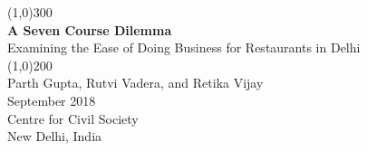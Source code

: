 \documentclass[a4paper, 12pt]{article}
\begin{document}
                    
                    
                    \begin{titlepage}
                    \begin{center}
                    	
			\line(1,0){300}\\
                    	[0.25in]
                    	\huge{\bfseries \textcolor{CCSbrown} {A Seven Course Dilemma}} \\
    			[0.5cm]
    			\large  {Examining the Ease of Doing Business for Restaurants in Delhi} \\%
    	
                    	\line(1,0){200}\\
                    	[1in]
                    	\Large {Parth Gupta, Rutvi Vadera, and Retika Vijay} \\ %
                    	[1.5cm]
                    	{\Large September 2018} \\
                    	[2.0cm]
   
                    	{\LARGE Centre for Civil Society} \\
                    	[0.1mm]
                    	{\Large New Delhi, India} \\
    			
      
                    \end{center}
                    \end{titlepage}
                    
                    \tableofcontents
                    
                   \newpage
                   
\end{document}
